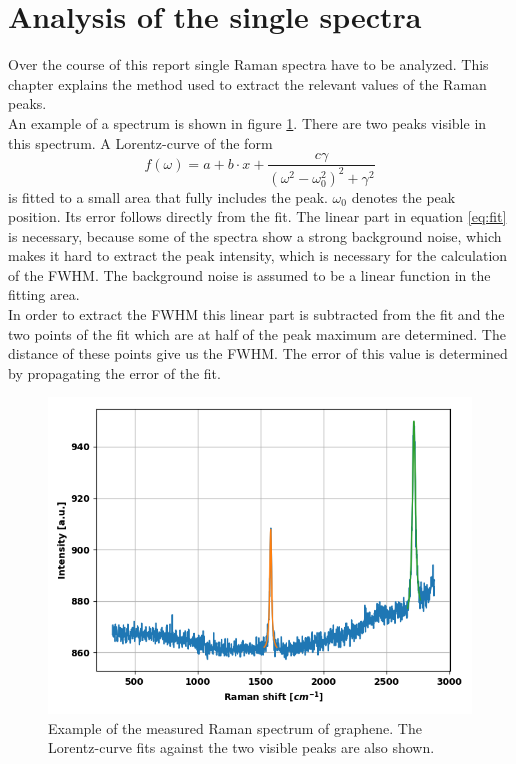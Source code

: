 \documentclass[12pt,a4paper]{article}
\begin{document}
\section{Analysis of the single spectra}
\label{sec:analysis}
Over the course of this report single Raman spectra have to be analyzed. This chapter explains the method used to extract the relevant values of the Raman peaks.\\
An example of a spectrum is shown in figure \ref{fig:example_spectrum}. There are two peaks visible in this spectrum. A Lorentz-curve of the form
\begin{equation}
f(\omega) = a + b \cdot x + \dfrac{c \gamma}{(\omega^2-\omega_0^2)^2 + \gamma^2}
\label{eq:fit}
\end{equation}
is fitted to a small area that fully includes the peak. $\omega_0$ denotes the peak position. Its error follows directly from the fit. The linear part in equation \ref{eq:fit} is necessary, because some of the spectra show a strong background noise, which makes it hard to extract the peak intensity, which is necessary for the calculation of the FWHM. The background noise is assumed to be a linear function in the fitting area.\\
In order to extract the FWHM this linear part is subtracted from the fit and the two points of the fit which are at half of the peak maximum are determined. The distance of these points give us the FWHM. The error of this value is determined by propagating the error of the fit.
\begin{figure}
\centering
\includegraphics[scale=0.5]{Bilder/part6/1.png}
\caption{Example of the measured Raman spectrum of graphene. The Lorentz-curve fits against the two visible peaks are also shown.}
\label{fig:example_spectrum}
\end{figure}
\end{document}
